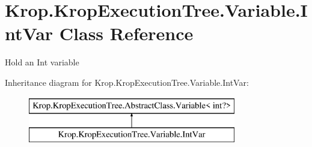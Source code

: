 \hypertarget{class_krop_1_1_krop_execution_tree_1_1_variable_1_1_int_var}{}\section{Krop.\+Krop\+Execution\+Tree.\+Variable.\+Int\+Var Class Reference}
\label{class_krop_1_1_krop_execution_tree_1_1_variable_1_1_int_var}


Hold an Int variable  


Inheritance diagram for Krop.\+Krop\+Execution\+Tree.\+Variable.\+Int\+Var\+:\begin{figure}[H]
\begin{center}
\leavevmode
\includegraphics[height=2.000000cm]{class_krop_1_1_krop_execution_tree_1_1_variable_1_1_int_var}
\end{center}
\end{figure}
